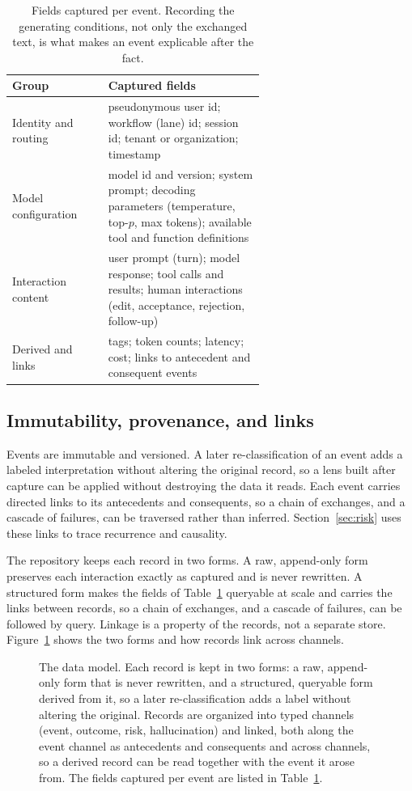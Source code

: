\documentclass[11pt]{article}
\begin{document}
\begin{table}[t]
\centering
\small
\begin{tabular}{lp{0.62\linewidth}}
\toprule
Group & Captured fields \\
\midrule
Identity and routing & pseudonymous user id; workflow (lane) id; session id; tenant or organization; timestamp \\
Model configuration & model id and version; system prompt; decoding parameters (temperature, top-$p$, max tokens); available tool and function definitions \\
Interaction content & user prompt (turn); model response; tool calls and results; human interactions (edit, acceptance, rejection, follow-up) \\
Derived and links & tags; token counts; latency; cost; links to antecedent and consequent events \\
\bottomrule
\end{tabular}
\caption{Fields captured per event. Recording the generating conditions, not
only the exchanged text, is what makes an event explicable after the fact.}
\label{tab:fields}
\end{table}

\subsection{Immutability, provenance, and links}

Events are immutable and versioned. A later re-classification of an event adds a
labeled interpretation without altering the original record, so a lens built
after capture can be applied without destroying the data it reads. Each event
carries directed links to its antecedents and consequents, so a chain of
exchanges, and a cascade of failures, can be traversed rather than inferred.
Section~\ref{sec:risk} uses these links to trace recurrence and causality.

The repository keeps each record in two forms. A raw, append-only form preserves
each interaction exactly as captured and is never rewritten. A structured form
makes the fields of Table~\ref{tab:fields} queryable at scale and carries the
links between records, so a chain of exchanges, and a cascade of failures, can be
followed by query. Linkage is a property of the records, not a separate store.
Figure~\ref{fig:datamodel} shows the two forms and how records link across
channels.

\begin{figure}[t]
\centering
\resizebox{\textwidth}{!}{}
\caption{The data model. Each record is kept in two forms: a raw, append-only form
that is never rewritten, and a structured, queryable form derived from it, so a
later re-classification adds a label without altering the original. Records are
organized into typed channels (event, outcome, risk, hallucination) and linked,
both along the event channel as antecedents and consequents and across channels, so
a derived record can be read together with the event it arose from. The fields
captured per event are listed in Table~\ref{tab:fields}.}
\label{fig:datamodel}
\end{figure}
\end{document}
